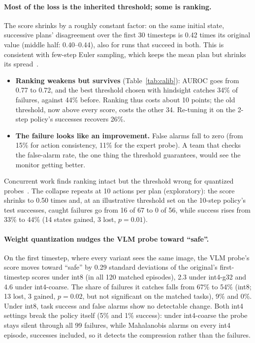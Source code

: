 \documentclass{article}
\begin{document}
\paragraph{Most of the loss is the inherited threshold; some is ranking.} The score shrinks by a
roughly constant factor: on the same initial state, successive plans' disagreement over the first
30 timesteps is 0.42 times its original value (middle half: 0.40--0.44), also for
runs that succeed in both. This is consistent with few-step Euler sampling, which keeps the mean
plan but shrinks its spread~\citep{coupling}.
\begin{itemize}
  \item \textbf{Ranking weakens but survives} (Table~\ref{tab:calib}): AUROC goes from 0.77 to
  0.72, and the best threshold chosen with hindsight catches 34\% of failures, against 44\%
  before. Ranking thus costs about 10 points; the old threshold, now above every score, costs
  the other 34. Re-tuning it on the 2-step policy's successes recovers 26\%.
  \item \textbf{The failure looks like an improvement.} False alarms fall to zero (from 15\% for
  action consistency, 11\% for the expert probe). A team that checks the false-alarm rate, the
  one thing the threshold guarantees, would see the monitor getting better.
\end{itemize}
Concurrent work finds ranking intact but the threshold wrong for quantized
probes~\citep{rankpreserving}. The collapse repeats at 10 actions per plan (exploratory): the score
shrinks to 0.50 times and, at an illustrative threshold set on the 10-step policy's test successes,
caught failures go from 16 of 67 to 0 of 56, while success rises from 33\% to 44\% (14 states
gained, 3 lost, $p{=}0.01$).

\paragraph{Weight quantization nudges the VLM probe toward ``safe''.} On the first timestep,
where every variant sees the same image, the VLM probe's score moves toward ``safe'' by 0.29
standard deviations of the original's first-timestep scores under int8 (in all 120 matched
episodes), 2.3 under int4-g32 and 4.6 under int4-coarse. The share of failures it catches falls
from 67\% to 54\% (int8; 13 lost, 3 gained, $p{=}0.02$, but not significant on the matched tasks),
9\% and 0\%. Under int8, task success and false alarms show no detectable change. Both int4
settings break the policy itself (5\% and 1\% success): under int4-coarse the probe stays silent
through all 99 failures, while Mahalanobis alarms on every int4 episode, successes included, so
it detects the compression rather than the failures.
\end{document}
